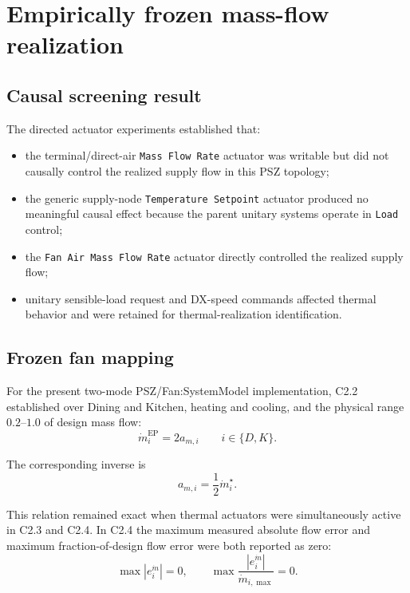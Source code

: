 \documentclass[11pt]{article}
\newcommand{\mdot}{\dot m}
\begin{document}
\section{Empirically frozen mass-flow realization}

\subsection{Causal screening result}

The directed actuator experiments established that:
\begin{itemize}[leftmargin=2em]
\item the terminal/direct-air \texttt{Mass Flow Rate} actuator was writable but
did not causally control the realized supply flow in this PSZ topology;
\item the generic supply-node \texttt{Temperature Setpoint} actuator produced
no meaningful causal effect because the parent unitary systems operate in
\texttt{Load} control;
\item the \texttt{Fan Air Mass Flow Rate} actuator directly controlled the
realized supply flow;
\item unitary sensible-load request and DX-speed commands affected thermal
behavior and were retained for thermal-realization identification.
\end{itemize}

\subsection{Frozen fan mapping}

For the present two-mode PSZ/Fan:SystemModel implementation, C2.2 established
over Dining and Kitchen, heating and cooling, and the physical range
$0.2$--$1.0$ of design mass flow:
\begin{equation}
\boxed{
\mdot_{i}^{\mathrm{EP}} = 2 a_{m,i}
}
\qquad i\in\{D,K\}.
\label{eq:exact-fan-forward}
\end{equation}

The corresponding inverse is
\begin{equation}
\boxed{
a_{m,i}
=
\frac{1}{2}\mdot_i^\star .
}
\label{eq:exact-fan-inverse}
\end{equation}

This relation remained exact when thermal actuators were simultaneously active
in C2.3 and C2.4.  In C2.4 the maximum measured absolute flow error and maximum
fraction-of-design flow error were both reported as zero:
\begin{equation}
\max |e_i^{\mdot}| = 0,
\qquad
\max
\frac{|e_i^{\mdot}|}{\mdot_{i,\max}}
=0.
\label{eq:c24-flow-zero-error}
\end{equation}
\end{document}
